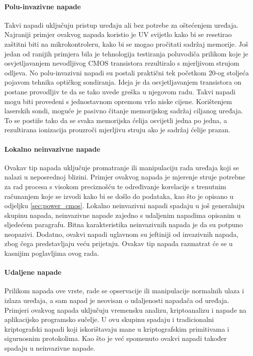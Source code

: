 \documentclass[times, utf8, diplomski]{fer}
\begin{document}
\paragraph{Polu-invazivne napade }
Takvi napadi uključuju pristup uređaju ali bez potrebe za oštećenjem uređaja. Najraniji primjer ovakvog napada koristio je UV svijetlo kako bi se resetirao zaštitni biti na mikrokontroleru, kako bi se mogao pročitati sadržaj memorije. Još jedan od ranijih primjera bila je tehnologija testiranja poluvodiča prilikom koje je osvjetljavanjem nevodljivog CMOS transistora rezultiralo s mjerljivom strujom odljeva. No polu-invazivni napadi su postali praktični tek početkom 20-og stoljeća pojavom tehnika optičkog sondiranja. Ideja je da osvjetljavanjem transistora on postane provodljiv te da se tako uvede greška u njegovom radu. Takvi napadi mogu biti provedeni s jednostavnom opremom vrlo niske cijene. Korištenjem laserskih sondi, moguće je pasivno čitanje memorijskog sadržaj ciljanog uređaja. To se postiže tako da se svaka memorijska ćelija osvijetli jedna po jedna, a rezultirana ionizacija prouzroči mjerljivu struju ako je sadržaj ćelije prazan.

\paragraph{Lokalno neinvazivne napade } Ovakav tip napada uključuje promatranje ili manipulaciju rada uređaja koji se nalazi u neposrednoj blizini. Primjer ovakvog napada je mjerenje struje potrebne za rad procesa s visokom preciznošću te određivanje korelacije s trenutnim računanjem koje se izvodi kako bi se došlo do podataka, kao što je opisano u odjeljku \ref{sec:power_cmos}. Lokalno neinvazivni napadi spadaju u još generalniju skupinu napada, neinvazivne napade  zajedno s udaljenim napadima opisanim u sljedećem paragrafu. Bitna karakteristika neinvazivnih napada je da su potpuno neopazivi. Dodatno, ovakvi napadi uglavnom su jeftiniji od invazivnih napada, zbog čega predstavljaju veću prijetnju. Ovakav tip napada razmatrat će se u kasnijim poglavljima ovog rada.

\paragraph{Udaljene napade } Prilikom napada ove vrste, rade se opservacije ili manipulacije normalnih ulaza i izlaza uređaja, a sam napad je neovisan o udaljenosti napadača od uređaja. Primjeri ovakvog napada uključuju vremensku analizu, kriptoanalizu i napade na aplikacijsko programsko sučelje. U ovu skupinu spadaju i tradicionalni kriptografski napadi koji iskorištavaju mane u kriptografskim primitivama i sigurnosnim protokolima. Kao što je već spomenuto ovakvi napadi također spadaju u neinvazivne napade.
\end{document}
